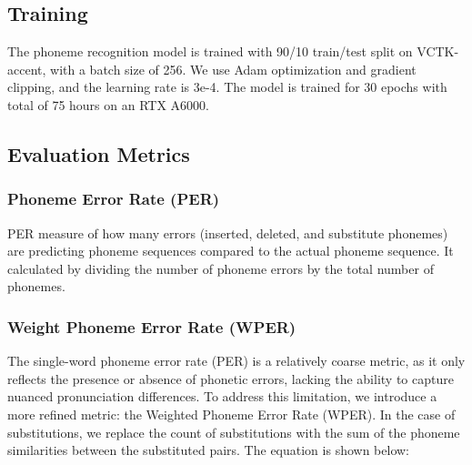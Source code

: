 \vspace{-5pt}
\subsection{Training}
The phoneme recognition model is trained with 90/10 train/test split on VCTK-accent, with a batch size of 256. We use Adam optimization and gradient clipping, and the learning rate is 3e-4. The model is trained for 30 epochs with total of 75 hours on an RTX A6000.




\subsection{Evaluation Metrics}
\vspace{-3pt}
\subsubsection{Phoneme Error Rate (PER)}
PER measure of how many errors (inserted, deleted, and substitute phonemes) are predicting phoneme sequences compared to the actual phoneme sequence. It calculated by dividing the number of phoneme errors by the total number of phonemes.


\vspace{-5pt}
\subsubsection{Weight Phoneme Error Rate (WPER)}
The single-word phoneme error rate (PER) is a relatively coarse metric, as it only reflects the presence or absence of phonetic errors, lacking the ability to capture nuanced pronunciation differences. To address this limitation, we introduce a more refined metric: the Weighted Phoneme Error Rate (WPER). In the case of substitutions, we replace the count of substitutions with the sum of the phoneme similarities between the substituted pairs. The equation is shown below:

